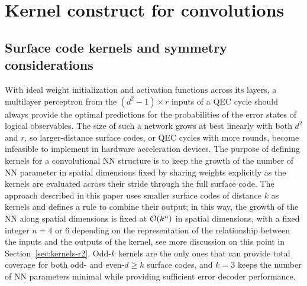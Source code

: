 \section{Kernel construct for convolutions}
\label{sec:kernelconstruct}

\subsection{Surface code kernels and symmetry considerations}
\label{sec:kernels}


With ideal weight initialization and activation functions across its layers, a multilayer perceptron from the $(d^2-1)\times r$ inputs of a QEC cycle should always provide the optimal predictions for the probabilities of the error states of logical observables. The size of such a network grows at best linearly with both $d^2$ and $r$, so larger-distance surface codes, or QEC cycles with more rounds, become infeasible to implement in hardware acceleration devices. The purpose of defining kernels for a convolutional NN structure is to keep the growth of the number of NN parameter in spatial dimensions fixed by sharing weights explicitly as the kernels are evaluated across their stride through the full surface code. The approach described in this paper uses smaller surface codes of distance $k$ as kernels and defines a rule to combine their output; in this way, the growth of the NN along spatial dimensions is fixed at $\mathcal{O}(k^n)$ in spatial dimensions, with a fixed integer $n=4$ or 6 depending on the representation of the relationship between the inputs and the outputs of the kernel, see more discussion on this point in Section~\ref{sec:kernels-r2}.
Odd-$k$ kernels are the only ones that can provide total coverage for both odd- and even-$d \geq k$ surface codes, and $k=3$ keeps the number of NN parameters minimal while providing sufficient error decoder performance.

